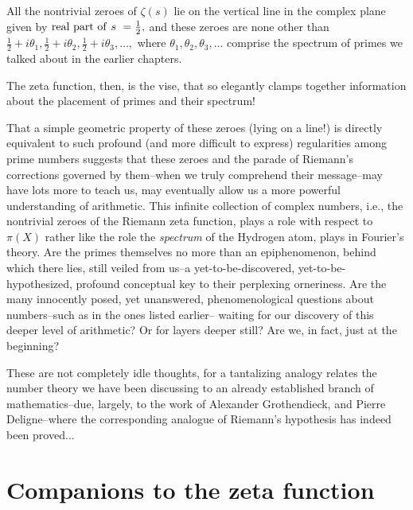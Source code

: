 \documentclass[openany]{book}
\theoremstyle{plain}
\theoremstyle{definition}
\begin{document}
{{\begin{center}
{\begin{minipage}{0.9\textwidth}
       All the nontrivial zeroes of $\zeta(s)$ lie on the vertical
       line in the complex plane given by ${\rm real\ part\ of\ } s\ =
       {\frac{1}{2}},$ and these zeroes are none other than
       ${\frac{1}{2}}+i\theta_1,{\frac{1}{2}}+i\theta_2,
       {\frac{1}{2}}+i\theta_3,\dots,$ where $\theta_1, \theta_2,
       \theta_3, \dots$ comprise the spectrum of primes we talked
       about in the earlier chapters.

\vspace{1ex}
\end{minipage}}
      \end{center}


      The zeta function, then, is the vise, that so elegantly clamps
      together information about the placement of primes and their
      spectrum!


That a simple geometric property of these zeroes (lying on a line!) is
directly equivalent to such profound (and more difficult to express)
regularities among prime numbers suggests that these zeroes and the
parade of Riemann's corrections governed by them--when we truly
comprehend their message--may have lots more to teach us, may
eventually allow us a more powerful understanding of arithmetic.  This
infinite collection of complex numbers, i.e., the nontrivial zeroes of
the Riemann zeta function, plays a role with respect to $\pi(X)$ rather
like the role the {\em spectrum} of the Hydrogen atom, plays in
Fourier's theory.  Are the primes themselves no more than an
epiphenomenon, behind which there lies, still veiled from us--a
yet-to-be-discovered, yet-to-be-hypothesized, profound conceptual key
to their perplexing orneriness.  Are the many innocently posed, yet
unanswered, phenomenological questions about numbers--such as in the
ones listed earlier-- waiting for our discovery of this deeper level
of arithmetic?  Or for layers deeper still?  Are we, in fact, just at
the beginning?




These are not completely idle thoughts, for a tantalizing analogy
relates the number theory we have been discussing to an already
established branch of mathematics--due, largely, to the work of
Alexander Grothendieck, and Pierre Deligne--where the corresponding
analogue of Riemann's hypothesis has indeed been proved$\dots$



\chapter{Companions to the zeta function}

}}
\end{document}
